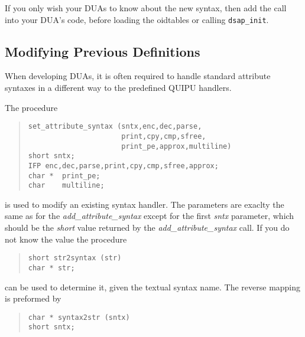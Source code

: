 If you only wish your DUAs to know about the new syntax, then add the call
into your DUA's code, before loading the oidtables or calling \verb+dsap_init+.


\subsection {Modifying Previous Definitions}

When developing DUAs, it is often required to handle standard
attribute syntaxes in a different way to the predefined QUIPU
handlers.  

The procedure
\begin{quote}\small\begin{verbatim}
set_attribute_syntax (sntx,enc,dec,parse,
                      print,cpy,cmp,sfree,
                      print_pe,approx,multiline)
short sntx;
IFP	enc,dec,parse,print,cpy,cmp,sfree,approx;
char *  print_pe;
char	multiline;
\end{verbatim}\end{quote}
is used to modify an existing syntax handler.  The parameters are
exaclty the same as for the {\em add\_attribute\_syntax} except for the
first {\em sntx} parameter, which should be 
the {\em short} value returned by the
{\em add\_attribute\_syntax} call.
If you do not know the value the procedure
\begin{quote}\small\begin{verbatim}
short str2syntax (str)
char * str;
\end{verbatim}\end{quote}
can be used to determine it, given the textual syntax name.
The reverse mapping is preformed by
\begin{quote}\small\begin{verbatim}
char * syntax2str (sntx)
short sntx;
\end{verbatim}\end{quote}

